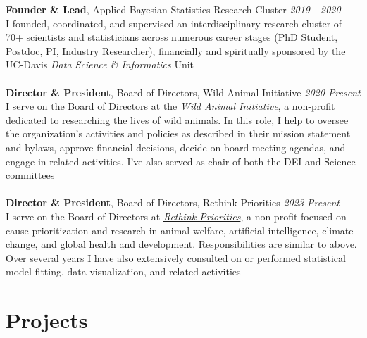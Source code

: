 \documentclass[12pt]{article}
\begin{document}
\textbf{Founder \& Lead}, Applied Bayesian Statistics Research Cluster \hfill \emph{2019 - 2020}\\
I founded, coordinated, and supervised an interdisciplinary research cluster of 70+ scientists and statisticians across numerous career stages (PhD Student, Postdoc, PI, Industry Researcher), financially and spiritually sponsored by the UC-Davis \emph{Data Science \& Informatics} Unit\\\\
\textbf{Director \& President}, Board of Directors, Wild Animal Initiative \hfill \emph{2020-Present}\\
I serve on the Board of Directors at the \textit{\href{https://www.wildanimalinitiative.org/}{Wild Animal Initiative}}, a non-profit dedicated to researching the lives of wild animals. In this role, I help to oversee the organization's activities and policies as described in their mission statement and bylaws, approve financial decisions, decide on board meeting agendas, and engage in related activities.  I've also served as chair of both the DEI and Science committees\\\\
\textbf{Director \& President}, Board of Directors, Rethink Priorities \hfill \emph{2023-Present}\\
I serve on the Board of Directors at \textit{\href{https://rethinkpriorities.org/}{Rethink Priorities}}, a non-profit focused on cause prioritization and research in animal welfare, artificial intelligence, climate change,  and global health and development. Responsibilities are similar to above. Over several years I have also extensively consulted on or performed statistical model fitting, data visualization, and related activities

\section{Projects}
\end{document}
